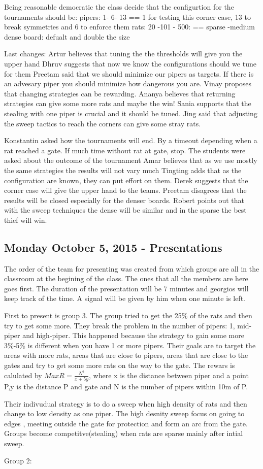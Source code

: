 Being reasonable democratic the class decide that the configurtion for the tournaments should be:
pipers: 1- 6- 13 == 1 for testing this corner case, 13 to break symmetries and 6 to enforce them
rats: 20 -101 - 500: == sparse -medium dense
board: defualt and double the size

Last changes:
Artur believes that tuning the the thresholds will give you the upper hand
Dhruv suggests that now we know the configurations should we tune for them
Preetam said that we should minimize our pipers as targets. If there is an advesary piper
you should minimize how dangerous you are.
Vinay proposes that changing strategies can be rewarding.
Ananya believes that returning strategies can give some more rats and maybe the win!
Sania supports that the stealing with one piper is crucial and it should be tuned.
Jing said that adjusting the sweep tactics to reach the corners can give some 
stray rats.

Konstantin asked how the tournaments will end. By a timeout depending when a rat 
reached a gate. If much time without rat at gate, stop.
The students were asked about the outcome of the tournament
Amar believes that as we use mostly the same strategies the results will not vary much
Tingting adds that as the configuration are known, they can put effort on them.
Derek suggests that the corner case will give the upper hand to the teams.
Preetam disagrees that the results will be closed especially for the denser boards.
Robert points out that with the sweep techniques the dense will be similar and in the sparse the best thief will win.

\subsection{Monday October 5, 2015 - Presentations}

The order of the team for presenting was created from which groups are all in the
classroom at the begining of the class. The ones that all the members are here
goes first. The duration of the presentation will be 7 minutes and georgios will 
keep track of the time. A signal will be given by him when one minute is left.

First to present is group 3.
The group tried to get the 25\% of the rats and then try to get some more. They
break the problem in the number of pipers: 1, mid-piper and high-piper. This
happened because the strategy to gain some more 3\%-5\% is different when you
have 1 or more pipers. Their goals are to target the areas with more rats, areas
that are close to pipers, areas that are close to the gates and try to get some
more rats on the way to the gate. The rewars is calulated by $Max R = \frac{N^2}{x+5y}$, where x is the distance between piper and a point P,y is the distance 
P and gate and N is the number of pipers within 10m of P.

Their indivudual strategy is to do a sweep when high density of rats and then 
change to low density as one piper. The high desnity sweep focus on going to edges
, meeting outside the gate for protection and form an arc from the gate.
Groups become competitve(stealing) when rats are sparse mainly after intial sweep.

Group 2:


